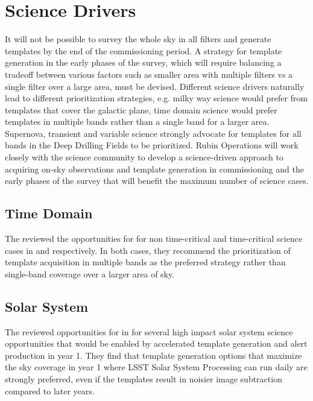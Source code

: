 \section{Science Drivers} \label{sec:science}

It will not be possible to survey the whole sky in all filters and generate templates by the end of the commissioning period. 
A strategy for template generation in the early phases of the survey, which will require balancing a tradeoff between various factors such as smaller area with multiple filters vs a single filter over a large area, must be devised. 
Different science drivers naturally lead to different prioritization strategies, e.g. milky way science would prefer from templates that cover the galactic plane, time domain science would prefer templates in multiple bands rather than a single band for a larger area. 
Supernova, transient and variable science strongly advocate for templates for all bands in the Deep Drilling Fields to be prioritized. 
Rubin Operations will work closely with the science community to develop a science-driven approach to acquiring on-sky observations and template generation in commissioning and the early phases of the survey that will benefit the maximum number of science cases. 

\subsection{Time Domain}

The \tvssc reviewed the opportunities for \es for non time-critical and time-critical science cases in \citep{Hambleton_2020} and \citep{Street_2020} respectively. 
In both cases, they recommend the prioritization of template acquisition in multiple bands as the preferred strategy rather than single-band  coverage over a larger area of sky. 

\subsection{Solar System}

The \sssc reviewed opportunities for \es in \citep{2020arXiv201005926L} for several high impact solar system science opportunities that would be enabled by accelerated template generation and alert production in year 1. 
They find that template generation options that maximize the sky coverage in year 1 where LSST Solar System Processing can run daily are strongly preferred, even if the templates result in noisier image subtraction compared to later years.

